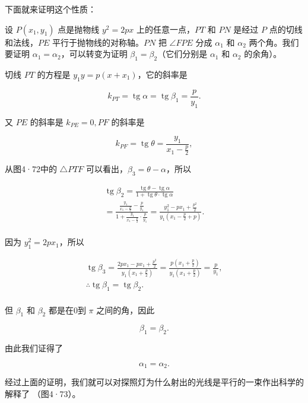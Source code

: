 下面就来证明这个性质：

设 \(P(x_{1},y_{1})\) 点是抛物线 \(y^{2} = 2px\) 上的任意一点，\(PT\) 和
\(PN\) 是经过 \(P\) 点的切线和法线，\(PE\) 平行于抛物线的对称轴。\(PN\)
把 \(\angle FPE\) 分成 \(\alpha_{1}\) 和 \(\alpha_{2}\)
两个角。我们要证明 \(\alpha_{1} = \alpha_{2}\)，可以转变为证明
\(\beta_{1} = \beta_{2}\)（它们分别是 \(\alpha_{1}\) 和 \(\alpha_{2}\)
的余角）。

切线 \(PT\) 的方程是 \(y_{1}y = p(x + x_{1})\)，它的斜率是

\[
k_{PT} = \operatorname{tg} \alpha = \operatorname{tg} \beta_{1} = \frac {p}{y_{1}}.
\]

又 \(PE\) 的斜率是 \(k_{PE} = 0, PF\) 的斜率是

\[
k_{PF} = \operatorname{tg} \theta = \frac {y_{1}}{x_{1} - \frac {p}{2}},
\]

从图4·72中的 \(\triangle PTF\)
可以看出，\(\beta_{3} = \theta - \alpha\)，所以

\[
\begin{array}{l} \operatorname{tg} \beta_{2} = \frac {\operatorname{tg} \theta - \operatorname{tg} \alpha}{1 + \operatorname{tg} \theta \cdot \operatorname{tg} \alpha} \\ = \frac {\frac {y_{1}}{x_{1} - \frac {p}{2}} - \frac {p}{y_{1}}}{1 + \frac {y_{1}}{x_{1} - \frac {p}{2}} \cdot \frac {p}{y_{1}}} = \frac {y_{1} ^ {2} - p x_{1} + \frac {p^{2}}{2}}{y_{1} \left(x_{1} - \frac {p}{2} + p\right)}. \\ \end{array}
\]

因为 \(y_{1}^{2} = 2px_{1}\)，所以

\[
\begin{array}{l} \operatorname{tg} \beta_{3} = \frac {2 p x_{1} - p x_{1} + \frac {p^{2}}{2}}{y_{1} \left(x_{1} + \frac {p}{2}\right)} = \frac {p \left(x_{1} + \frac {p}{2}\right)}{y_{1} \left(x_{1} + \frac {p}{2}\right)} = \frac {p}{y_{1}}, \\ \therefore \operatorname{tg} \beta_{1} = \operatorname{tg} \beta_{2}. \\ \end{array}
\]

但 \(\beta_{1}\) 和 \(\beta_{2}\) 都是在0到 \(\pi\) 之间的角，因此

\[
\beta_{1} = \beta_{2}.
\]

由此我们证得了

\[
\alpha_{1} = \alpha_{2}.
\]

经过上面的证明，我们就可以对探照灯为什么射出的光线是平行的一束作出科学的解释了
（图4·73）。


